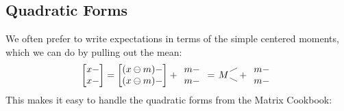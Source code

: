 \subsection{Quadratic Forms}
We often prefer to write expectations in terms of the simple centered moments, which we can do by pulling out the mean:
\renewcommand*{\arraystretch}{1}
\[
   \begin{bmatrix}
      x - \\
      x -
   \end{bmatrix}
   =
   \begin{bmatrix}
      (x\ominus m) - \\
      (x\ominus m) -
   \end{bmatrix}
   +
   \begin{array}{c}
      m - \\
      m -
   \end{array}
   =
   \begin{tikzpicture}[baseline=(T.base), inner sep=1pt]
      \node (T) {$M$};
      \draw (T) -- ++(.5,.25);
      \draw (T) -- ++(.5,-.25);
   \end{tikzpicture}
   +
   \begin{array}{c}
      m - \\
      m -
   \end{array}
\]
This makes it easy to handle the quadratic forms from the Matrix Cookbook:
